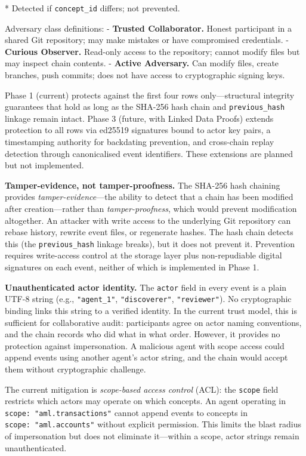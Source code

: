 * Detected if \texttt{concept\_id} differs; not prevented.

Adversary class definitions: - \textbf{Trusted Collaborator.} Honest participant in a shared Git repository; may make mistakes or have compromised credentials. - \textbf{Curious Observer.} Read-only access to the repository; cannot modify files but may inspect chain contents. - \textbf{Active Adversary.} Can modify files, create branches, push commits; does not have access to cryptographic signing keys.

Phase 1 (current) protects against the first four rows only---structural integrity guarantees that hold as long as the SHA-256 hash chain and \texttt{previous\_hash} linkage remain intact. Phase 3 (future, with Linked Data Proofs) extends protection to all rows via ed25519 signatures bound to actor key pairs, a timestamping authority for backdating prevention, and cross-chain replay detection through canonicalised event identifiers. These extensions are planned but not implemented.

\textbf{Tamper-evidence, not tamper-proofness.} The SHA-256 hash chaining provides \emph{tamper-evidence}---the ability to detect that a chain has been modified after creation---rather than \emph{tamper-proofness}, which would prevent modification altogether. An attacker with write access to the underlying Git repository can rebase history, rewrite event files, or regenerate hashes. The hash chain detects this (the \texttt{previous\_hash} linkage breaks), but it does not prevent it. Prevention requires write-access control at the storage layer plus non-repudiable digital signatures on each event, neither of which is implemented in Phase 1.

\textbf{Unauthenticated actor identity.} The \texttt{actor} field in every event is a plain UTF-8 string (e.g., \texttt{"agent\_1"}, \texttt{"discoverer"}, \texttt{"reviewer"}). No cryptographic binding links this string to a verified identity. In the current trust model, this is sufficient for collaborative audit: participants agree on actor naming conventions, and the chain records who did what in what order. However, it provides no protection against impersonation. A malicious agent with scope access could append events using another agent's actor string, and the chain would accept them without cryptographic challenge.

The current mitigation is \emph{scope-based access control} (ACL): the \texttt{scope} field restricts which actors may operate on which concepts. An agent operating in \texttt{scope:\ "aml.transactions"} cannot append events to concepts in \texttt{scope:\ "aml.accounts"} without explicit permission. This limits the blast radius of impersonation but does not eliminate it---within a scope, actor strings remain unauthenticated.

